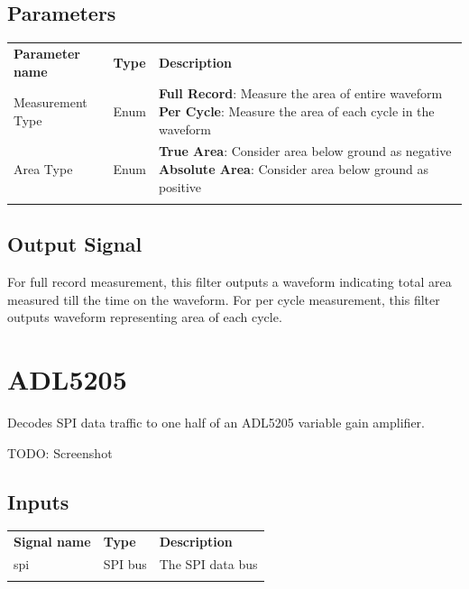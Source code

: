 \subsection{Parameters}

\begin{tabularx}{16cm}{llX}
\thickhline
\textbf{Parameter name} & \textbf{Type} & \textbf{Description} \\
\thickhline
Measurement Type & Enum &
	\textbf{Full Record}: Measure the area of entire waveform \newline
	\textbf{Per Cycle}: Measure the area of each cycle in the waveform\\
\thickhline
Area Type & Enum &
	\textbf{True Area}: Consider area below ground as negative\newline
	\textbf{Absolute Area}: Consider area below ground as positive\\
\thickhline
\end{tabularx}

\subsection{Output Signal}

For full record measurement, this filter outputs a waveform indicating total area measured till the time on the waveform.
For per cycle measurement, this filter outputs waveform representing area of each cycle.

\pagebreak
\section{ADL5205}
\label{filter:adl5205}

Decodes SPI data traffic to one half of an ADL5205 variable gain amplifier.

TODO: Screenshot

\subsection{Inputs}

\begin{tabularx}{16cm}{llX}
\thickhline
\textbf{Signal name} & \textbf{Type} & \textbf{Description} \\
\thickhline
spi & SPI bus & The SPI data bus \\
\thickhline
\end{tabularx}

